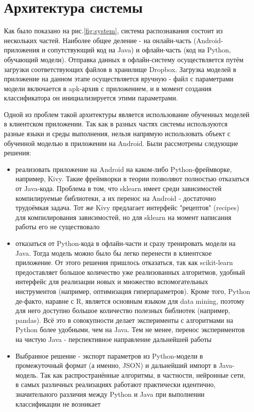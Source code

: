 
\section{Архитектура системы}

Как было показано на рис.\ref{fig:system}, система распознавания состоит из нескольких частей. Наиболее общее деление - на онлайн-часть (Android-приложения и сопутствующий код на Java) и офлайн-часть (код на Python, обучающий модели). Отправка данных в офлайн-систему осуществляется путём загрузки соответствующих файлов в хранилище Dropbox. Загрузка моделей в приложение на данном этапе осуществляется вручную - файл с параметрами модели включается в apk-архив с приложением, и в момент создания классификатора он инициализируется этими параметрами.

Одной из проблем такой архитектуры является использование обученных моделей в клиентском приложении. Так как в разных частях системы используются разные языки и среды выполнения, нельзя напрямую использовать объект с обученной моделью в приложении на Android. Были рассмотрены следующие решения:

\begin{itemize}
\item реализовать приложение на Android на каком-либо Python-фреймворке, например, Kivy. Такие фреймворки в теории позволяют полностью отказаться от Java-кода. Проблема в том, что sklearn имеет среди зависимостей компилируемые библиотеки, а их перенос на Android - достаточно трудоёмкая задача. Тот же Kivy предлагает интерфейс "рецептов" (recipes) для компилирования зависимостей, но для sklearn на момент написания работы его не существовало
\item отказаться от Python-кода в офлайн-части и сразу тренировать модели на Java. Тогда модель можно было бы легко перенести в клиентское приложение. От этого решения пришлось отказаться, так как scikit-learn предоставляет большое количество уже реализованных алгоритмов, удобный интерфейс для реализации новых и множество вспомогательных инструментов (например, оптимизация гиперпараметров). Кроме того, Python де-факто, наравне с R, является основным языком для data mining, поэтому для него доступно большое количество полезных библиотек (например, pandas). Всё это в совокупности делает эксперименты с алгоритмами на Python более удобными, чем на Java. Тем не менее, перенос экспериментов на чистую Java - перспективное направление дальнейшей работы
\item Выбранное решение - экспорт параметров из Python-модели в промежуточный формат (а именно, JSON) и дальнейший импорт в Java-модель. Так как распространённые алгоритмы, в частности, нейронные сети, в самых различных реализациях работают практически идентично, значительного различия между Python и Java при выполнении классификации не возникает
\end{itemize}



